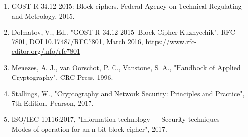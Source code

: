 \documentclass[12pt,a4paper]{article}
\begin{document}
\begin{enumerate}
    \item GOST R 34.12-2015: Block ciphers. Federal Agency on Technical Regulating and Metrology, 2015.
    
    \item Dolmatov, V., Ed., "GOST R 34.12-2015: Block Cipher Kuznyechik", RFC 7801, DOI 10.17487/RFC7801, March 2016, \url{https://www.rfc-editor.org/info/rfc7801}
    
    \item Menezes, A. J., van Oorschot, P. C., Vanstone, S. A., "Handbook of Applied Cryptography", CRC Press, 1996.
    
    \item Stallings, W., "Cryptography and Network Security: Principles and Practice", 7th Edition, Pearson, 2017.
    
    \item ISO/IEC 10116:2017, "Information technology — Security techniques — Modes of operation for an n-bit block cipher", 2017.
\end{enumerate}
\end{document}
